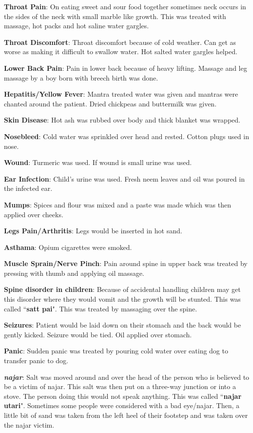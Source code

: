 \textbf{Throat Pain}: On eating sweet and sour food together sometimes neck
occurs in the sides of the neck with small marble like growth. This was treated
with massage, hot packs and hot saline water gargles.

\textbf{Throat Discomfort}: Throat discomfort because of cold weather. Can get
as worse as making it difficult to swallow water. Hot salted water gargles
helped.

\textbf{Lower Back Pain}: Pain in lower back because of heavy lifting. Massage
and leg massage by a boy born with breech birth was done.

\textbf{Hepatitis/Yellow Fever}: Mantra treated water was given and mantras
were chanted around the patient. Dried chickpeas and buttermilk was given.

\textbf{Skin Disease}: Hot ash was rubbed over body and thick blanket was
wrapped.

\textbf{Nosebleed}: Cold water was sprinkled over head and rested. Cotton plugs
used in nose.

\textbf{Wound}: Turmeric was used. If wound is small urine was used.

\textbf{Ear Infection}: Child's urine was used. Fresh neem leaves and oil was
poured in the infected ear.

\textbf{Mumps}: Spices and flour was mixed and a paste was made which was then
applied over cheeks.

\textbf{Legs Pain/Arthritis}: Legs would be inserted in hot sand.

\textbf{Asthama}: Opium cigarettes were smoked.

\textbf{Muscle Sprain/Nerve Pinch}: Pain around spine in upper back was treated
by pressing with thumb and applying oil massage. 

\textbf{Spine disorder in children}: Because of accidental handling children
may get this disorder where they would vomit and the growth will be stunted.
This was called ``\textbf{satt pai}". This was treated by massaging over the
spine.

\textbf{Seizures}: Patient would be laid down on their stomach and the back
would be gently kicked. Seizure would be tied. Oil applied over stomach. 

\textbf{Panic}: Sudden panic was treated by pouring cold water over eating dog
to transfer panic to dog.

\textbf{\textit{najar}}: Salt was moved around and over the head of the person
who is believed to be a victim of najar. This salt was then put on a three-way
junction or into a stove. The person doing this would not speak anything. This
was called ``\textbf{najar utari}". Sometimes some people were considered with
a bad eye/najar. Then, a little bit of sand was taken from the left heel of
their footstep and was taken over the najar victim. 

